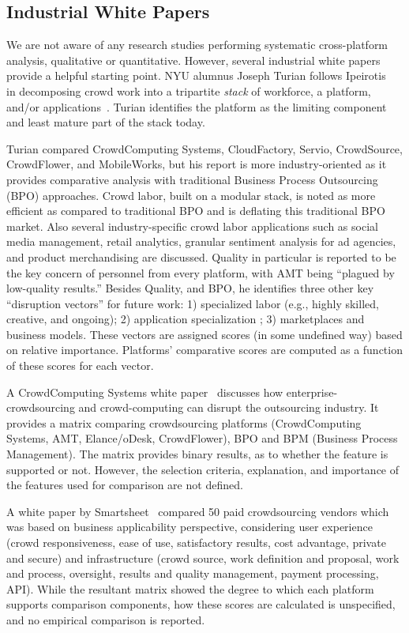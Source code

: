 \documentclass{sigchi}
\begin{document}
\vspace{-5pt} \subsection{Industrial White Papers}

We are not aware of any research studies performing systematic cross-platform analysis, qualitative or quantitative. However, several industrial white papers~\cite{frei2009paid,Turian12,info-evolution,CCSWhitepaper} 
provide a helpful starting point. NYU alumnus Joseph Turian follows Ipeirotis~\cite{ipeirotis-channel} in decomposing crowd work into a tripartite {\em stack} of workforce, a platform, and/or applications~\cite{Turian12}. Turian identifies the platform as the limiting component and least mature part of the stack today. 

Turian compared CrowdComputing Systems, CloudFactory, Servio, CrowdSource, CrowdFlower, and MobileWorks, but his report is more industry-oriented as it provides comparative analysis with traditional Business Process Outsourcing (BPO) approaches. Crowd labor, built on a modular stack, is noted as more efficient as compared to traditional BPO and is deflating this traditional BPO market. Also several industry-specific crowd labor applications such as social media management, retail analytics, granular sentiment analysis for ad agencies, and product merchandising are discussed.  Quality in particular is reported to be the key concern of personnel from every platform, with AMT being ``plagued by low-quality results.'' Besides Quality, and BPO, he identifies three other key ``disruption vectors'' for future work: 1) specialized labor (e.g., highly skilled, creative, and ongoing); 2)  application specialization ; 3) marketplaces and business models. These vectors are assigned scores (in some undefined way) based on relative importance. Platforms' comparative scores are computed as a function of these scores for each vector. 

A CrowdComputing Systems white paper~\cite{CCSWhitepaper} discusses how enterprise-crowdsourcing and crowd-computing can disrupt the outsourcing industry. It provides a matrix comparing crowdsourcing platforms (CrowdComputing Systems, AMT, Elance/oDesk, CrowdFlower), BPO and BPM (Business Process Management). The matrix provides binary results, as to whether the feature is supported or not. However, the selection criteria, explanation, and importance of the features used for comparison are not defined.

A white paper by Smartsheet~\cite{frei2009paid} compared 50 paid crowdsourcing vendors which was based on business applicability perspective, considering user experience (crowd responsiveness, ease of use, satisfactory results, cost advantage, private and secure) and infrastructure (crowd source, work definition and proposal, work and process, oversight, results and quality management, payment processing, API). While the resultant matrix showed the degree to which each platform supports comparison components, how these scores are calculated is unspecified, and no empirical comparison is reported.
\end{document}
